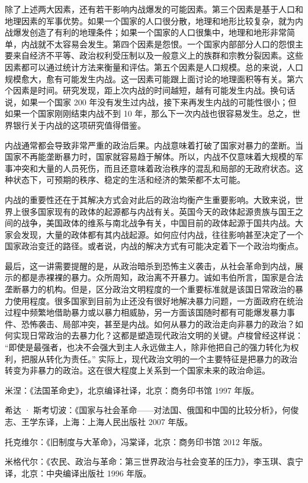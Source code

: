 除了上述两大因素，还有若干影响内战爆发的可能因素。第三个因素是基于人口和地理因素的军事优势。如果一个国家的人口很分散，地理和地形比较复杂，就为内战爆发创造了有利的地理条件；如果一个国家的人口很集中，地理和地形非常简单，内战就不太容易会发生。第四个因素是怨恨。一个国家内部部分人口的怨恨主要来自经济不平等、政治权利受压制以及一般意义上的族群和宗教分裂因素。这些因素都可以通过统计方法来衡量和评估。第五个因素是人口规模。总的来说，人口规模愈大，愈有可能发生内战。这一因素可能跟上面讨论的地理面积等有关。第六个因素是时间。研究发现，距上次内战的时间越短，越有可能发生内战。换句话说，如果一个国家 200 年没有发生过内战，接下来再发生内战的可能性很小；但如果一个国家刚刚结束内战不到 10 年，那么下一次内战也很容易发生。总之，世界银行关于内战的这项研究值得借鉴。

内战通常都会导致非常严重的政治后果。内战意味着打破了国家对暴力的垄断。当国家不再能垄断暴力时，国家就容易趋于解体。所以，内战不仅意味着大规模的军事冲突和大量的人员死伤，而且还意味着政治秩序的混乱和局部的无政府状态。这种状态下，可预期的秩序、稳定的生活和经济的繁荣都不太可能。

内战的重要性还在于其解决方式会对此后的政治均衡产生重要影响。大致来说，世界上很多国家现有的政体的起源都与内战有关。英国今天的政体起源贵族与国王之间的战争，美国政体的维系与南北战争有关，中国目前的政体起源于国共内战。大家会发现，大量的政体都有其内战起源。如何应付内战，往往影响甚至决定了一个国家政治变迁的路径。或者说，内战的解决方式有可能决定着下一个政治均衡点。

最后，这一讲需要提醒的是，从政治暗杀到恐怖主义袭击，从社会革命到内战，展示的都是赤裸裸的暴力。众所周知，政治离不开暴力。诚如韦伯所言，国家是合法垄断暴力的机构。但是，区分政治文明程度的一个重要标准就是该国日常政治的暴力使用程度。很多国家到目前为止还没有很好地解决暴力问题，一方面政府在统治过程中频繁地借助暴力或以暴力相威胁，另一方面该国随时都有可能爆发暴力事件、恐怖袭击、局部冲突，甚至是内战。如何从暴力的政治走向非暴力的政治？如何实现日常政治的去暴力化？这都是塑造现代政治文明的关键。卢梭曾经这样说： “即使是最强者，也决不会强大到主人永远做主人，除非他把自己的强力转化为权利，把服从转化为责任。” 实际上，现代政治文明的一个主要特征是把暴力的政治转变为非暴力的政治。这在很大程度上关系到一个国家未来的政治命运。


米涅：《法国革命史》，北京编译社译，北京：商务印书馆 1997 年版。

希达 · 斯考切波：《国家与社会革命——对法国、俄国和中国的比较分析》，何俊志、王学东译，上海：上海人民出版社 2007 年版。

托克维尔：《旧制度与大革命》，冯棠译，北京：商务印书馆 2012 年版。

米格代尔：《农民、政治与革命：第三世界政治与社会变革的压力》，李玉琪、袁宁译，北京：中央编译出版社 1996 年版。
